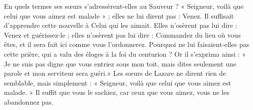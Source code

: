 En quels termes ses sœurs s’adressèrent-elles au Sauveur ? « Seigneur, voilà que celui que vous aimez est malade » ; elles ne lui dirent pas : Venez. Il suffisait d’apprendre cette nouvelle à Celui qui les aimait. Elles n’osèrent pas lui dire : Venez et guérissez-le ; elles n’osèrent pas lui dire : Commandez du lieu où vous êtes, et il sera fait ici comme vous l’ordonnerez. Pourquoi ne lui faisaient-elles pas cette prière, qui a valu des éloges à la foi du centurion ? Or il s’exprima ainsi : « Je ne suis pas digne que vous entriez sous mon toit, mais dites seulement une parole et mon serviteur sera guéri.» Les sœurs de Lazare ne dirent rien de semblable, mais simplement : « Seigneur, voilà que celui que vous aimez est malade. » Il suffit que vous le sachiez, car ceux que vous aimez, vous ne les abandonnez pas.
